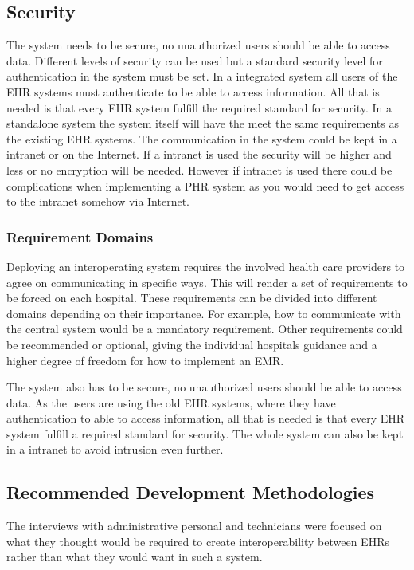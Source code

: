 \documentclass[14pt]{article}
\begin{document}
\subsection{Security}
\label{sec:resultsSecurity}
The system needs to be secure, no unauthorized users should be able to access data. Different levels of security can be used but a standard security level for authentication in the system must be set. In a integrated system all users of the \gls{EHR} systems must authenticate to be able to access information. All that is needed is that every EHR system fulfill the required standard for security. In a standalone system the system itself will have the meet the same requirements as the existing \gls{EHR} systems. The communication in the system could be kept in a intranet or on the Internet. If a intranet is used the security will be higher and less or no encryption will be needed. However if intranet is used there could be complications when implementing a \gls{PHR} system as you would need to get access to the intranet somehow via Internet.

\subsubsection{Requirement Domains}
Deploying an interoperating system requires the involved health care providers to agree on communicating in specific ways. This will render a set of requirements to be forced on each hospital. These requirements can be divided into different domains depending on their importance. For example, how to communicate with the central system would be a mandatory requirement. Other requirements could be recommended or optional, giving the individual hospitals guidance and a higher degree of freedom for how to implement an \gls{EMR}.

The system also has to be secure, no unauthorized users should be able to access data. As the users are using the old \gls{EHR} systems, where they have authentication to able to access information, all that is needed is that every \gls{EHR} system fulfill a required standard for security. The whole system can also be kept in a intranet to avoid intrusion even further.

\subsection{Recommended Development Methodologies}
The interviews with administrative personal and technicians were focused on what they thought would be required to create interoperability between \glspl{EHR} rather than what they would want in such a system. 
\end{document}
